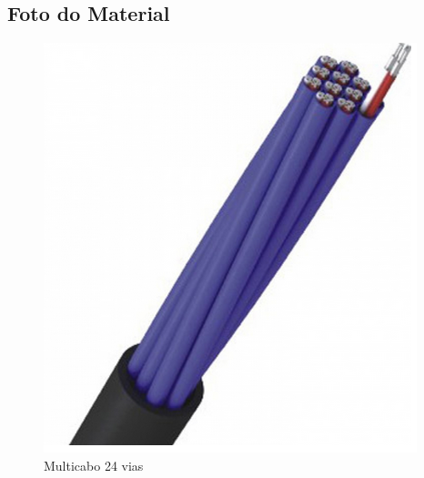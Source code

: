 \subsection{Foto do Material}
\begin{figure}[H]
 \centering
 \includegraphics[width=1\columnwidth]{Multicabos/foto.png}
 \caption{Multicabo 24 vias}
\end{figure}

